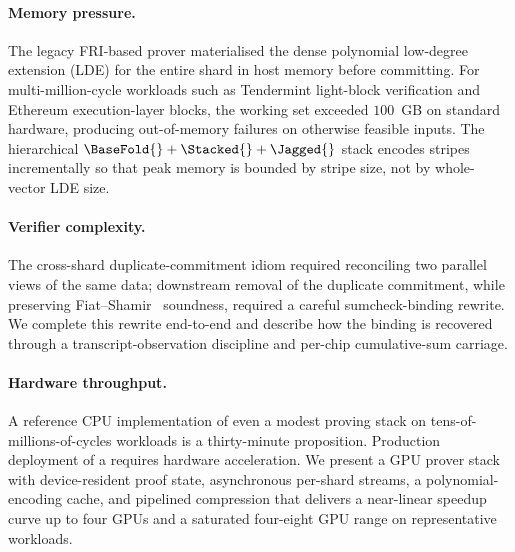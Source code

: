 \paragraph{Memory pressure.} The legacy FRI-based prover materialised the dense polynomial low-degree extension (LDE) for the entire shard in host memory before committing. For multi-million-cycle workloads such as Tendermint light-block verification and Ethereum execution-layer blocks, the working set exceeded $100$~GB on standard hardware, producing out-of-memory failures on otherwise feasible inputs. The hierarchical $\BaseFold{} + \Stacked{} + \Jagged{}$ stack encodes stripes incrementally so that peak memory is bounded by stripe size, not by whole-vector LDE size.

\paragraph{Verifier complexity.} The cross-shard duplicate-commitment idiom required reconciling two parallel views of the same data; downstream removal of the duplicate commitment, while preserving Fiat--Shamir~\citep{fiat-shamir} soundness, required a careful sumcheck-binding rewrite. We complete this rewrite end-to-end and describe how the binding is recovered through a transcript-observation discipline and per-chip cumulative-sum carriage.

\paragraph{Hardware throughput.} A reference CPU implementation of even a modest proving stack on tens-of-millions-of-cycles workloads is a thirty-minute proposition. Production deployment of a \zkVM{} requires hardware acceleration. We present a GPU prover stack with device-resident proof state, asynchronous per-shard streams, a polynomial-encoding cache, and pipelined compression that delivers a near-linear speedup curve up to four GPUs and a saturated four-eight GPU range on representative workloads.

